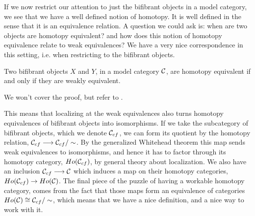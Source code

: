 If we now restrict our attention to just the bifibrant objects in a model category, we see that we have a well defined notion of homotopy. It is well defined in the sense that it is an equivalence relation. A question we could ask is: when are two objects are homotopy equivalent? and how does this notion of homotopy equivalence relate to weak equivalences? We have a very nice correspondence in this setting, i.e. when restricting to the bifibrant objects. 

\begin{theorem}
Two bifibrant objects $X$ and $Y$, in a model category $\mathcal{C}$, are homotopy equivalent if and only if they are weakly equivalent. 
\end{theorem}

We won't cover the proof, but refer to \cite[Theorem 1.2.10.]{hovey}. 

This means that localizing at the weak equivalences also turns homotopy equivalences of bifibrant objects into isomorphisms. If we take the subcategory of bifibrant objects, which we denote $\mathcal{C}_{cf}$, we can form its quotient by the homotopy relation, $\mathcal{C}_{cf}\longrightarrow \mathcal{C}_{cf}/\sim$. By the generalized Whitehead theorem this map sends weak equivalences to isomorphisms, and hence it has to factor through its homotopy category, $Ho(\mathcal{C}_{cf})$, by general theory about localization. We also have an inclusion $\mathcal{C}_{cf} \longrightarrow \mathcal{C}$ which induces a map on their homotopy categories, $Ho(\mathcal{C}_{cf})\rightarrow Ho(\mathcal{C})$. The final piece of the puzzle of having a workable homotopy category, comes from the fact that those maps form an equivalence of categories $Ho(\mathcal{C})\cong \mathcal{C}_{cf}/\sim$, which means that we have a nice definition, and a nice way to work with it.











